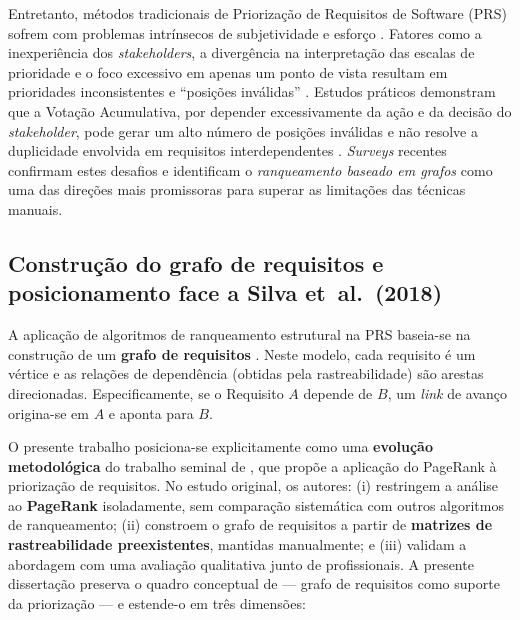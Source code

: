 Entretanto, métodos tradicionais de Priorização de Requisitos de
Software (PRS) sofrem com problemas intrínsecos de subjetividade e
esforço \parencite{firesmith2004, achimugu2014, bukhsh2020}. Fatores
como a inexperiência dos \emph{stakeholders}, a divergência na
interpretação das escalas de prioridade e o foco excessivo em apenas
um ponto de vista resultam em prioridades inconsistentes e ``posições
inválidas'' \parencite{silva2018}. Estudos práticos demonstram que a
Votação Acumulativa, por depender excessivamente da ação e da decisão
do \emph{stakeholder}, pode gerar um alto número de posições
inválidas e não resolve a duplicidade envolvida em requisitos
interdependentes \parencite{silva2018}. \emph{Surveys} recentes
\parencite{achimugu2014, bukhsh2020} confirmam estes desafios e
identificam o \emph{ranqueamento baseado em grafos} como uma das
direções mais promissoras para superar as limitações das técnicas
manuais.

\subsection{Construção do grafo de requisitos e posicionamento face
a Silva et~al.\ (2018)}
\label{sec:posicionamento}

A aplicação de algoritmos de ranqueamento estrutural na PRS baseia-se
na construção de um \textbf{grafo de requisitos}
\parencite{silva2018}. Neste modelo, cada requisito é um vértice e as
relações de dependência (obtidas pela rastreabilidade) são arestas
direcionadas. Especificamente, se o Requisito $A$ depende de $B$, um
\emph{link} de avanço origina-se em $A$ e aponta para $B$.

O presente trabalho posiciona-se explicitamente como uma
\textbf{evolução metodológica} do trabalho seminal de
\citet{silva2018}, que propõe a aplicação do PageRank à priorização
de requisitos. No estudo original, os autores: (i) restringem a
análise ao \textbf{PageRank} isoladamente, sem comparação sistemática
com outros algoritmos de ranqueamento; (ii) constroem o grafo de
requisitos a partir de \textbf{matrizes de rastreabilidade
preexistentes}, mantidas manualmente; e (iii) validam a abordagem com
uma avaliação qualitativa junto de profissionais. A presente
dissertação preserva o quadro conceptual de \citet{silva2018} ---
grafo de requisitos como suporte da priorização --- e estende-o em
três dimensões:

